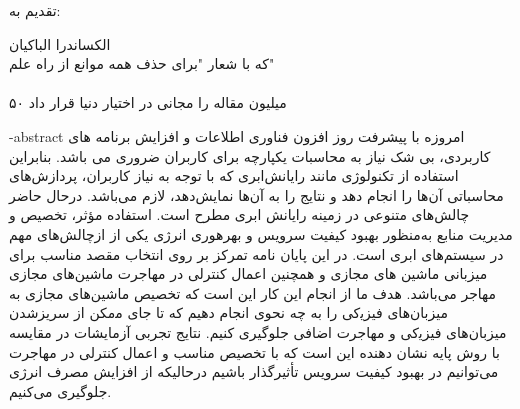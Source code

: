 \esalatPage
\mojavezPage



 \newpage
\thispagestyle{empty}
{\Large تقدیم به:}\\
\begin{flushleft}
{\huge
الکساندرا الباکیان\\
\vspace{7mm}
که با شعار "برای حذف همه موانع از راه علم" \\
\\
 ۵۰ میلیون مقاله را مجانی در اختیار دنیا قرار داد\\

\vspace{7mm}

}
\end{flushleft}


\fa-abstract{
اﻣﺮوزه ﺑﺎ ﭘﯿﺸﺮﻓﺖ روز اﻓﺰون ﻓﻨﺎوری اﻃﻼﻋﺎت و  اﻓﺰاﯾﺶ ﺑﺮﻧﺎﻣﻪ ﻫﺎی ﮐﺎرﺑﺮدی، ﺑﯽ شک ﻧﯿﺎز ﺑﻪ ﻣﺤﺎﺳﺒﺎت یکپارچه ﺑﺮای ﮐﺎرﺑﺮان ﺿﺮوری می ﺑﺎﺷﺪ. ﺑﻨﺎﺑﺮاﯾﻦ اﺳﺘﻔﺎده از ﺗﮑﻨﻮﻟﻮژی ﻣﺎﻧﻨﺪ راﯾﺎﻧﺶاﺑﺮی ﮐﻪ ﺑﺎ ﺗﻮﺟﻪ ﺑﻪ ﻧﯿﺎز ﮐﺎرﺑﺮان، ﭘﺮدازش‌ﻫﺎی ﻣﺤﺎﺳﺒﺎتی آن‌ﻫﺎ را اﻧﺠﺎم دﻫﺪ و ﻧﺘﺎﯾﺞ را ﺑﻪ آن‌ﻫﺎ ﻧﻤﺎﯾﺶدﻫﺪ، ﻻزم می‌باشد. درﺣﺎل ﺣﺎﺿﺮ ﭼﺎﻟﺶﻫﺎی ﻣﺘﻨﻮعی در زﻣﯿﻨﻪ راﯾﺎﻧﺶ اﺑﺮی ﻣﻄﺮح اﺳﺖ. استفاده مؤثر، ﺗﺨﺼﯿﺺ و مدیریت منابع به‌منظور بهبود کیفیت سرویس و بهره­وری انرژی یکی از ازﭼﺎﻟﺶﻫﺎی ﻣﻬﻢ در سیستم‌های ابری است.
در این پایان نامه تمرکز بر روی انتخاب مقصد مناسب برای میزبانی ماشین های مجازی و همچنین اعمال کنترلی در مهاجرت ماشین‌های مجازی مهاجر می‌باشد. هدف ما از انجام این کار این است ﮐﻪ ﺗﺨﺼﯿﺺ ﻣﺎﺷﯿﻦﻫﺎی ﻣﺠﺎزی ﺑﻪ ﻣﯿﺰﺑﺎنﻫﺎی ﻓﯿﺰﯾکی را ﺑﻪ ﭼﻪ ﻧﺤﻮی اﻧﺠﺎم دﻫﯿﻢ ﮐﻪ ﺗﺎ ﺟﺎی ﻣمکن از ﺳﺮﯾﺰﺷﺪن ﻣﯿﺰﺑﺎنﻫﺎی ﻓﯿﺰﯾکی و مهاجرت اضافی جلوگیری ﮐﻨﯿﻢ. نتایج تجربی آزمایشات در مقایسه با روش‌ پایه نشان دهنده این است که با تخصیص مناسب و اعمال کنترلی در مهاجرت می‌‌توانیم در بهبود کیفیت سرویس تأثیرگذار باشیم درحالیکه از افزایش مصرف انرژی جلوگیری می‌کنیم.
}



\abstractPage

\newpage\clearpage
